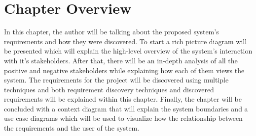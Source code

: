 \section{Chapter Overview}

In this chapter, the author will be talking about the proposed system's requirements and how they were discovered. To start a rich picture diagram will be presented which will explain the high-level overview of the system's interaction with it's stakeholders. After that, there will be an in-depth analysis of all the positive and negative stakeholders while explaining how each of them views the system. The requirements for the project will be discovered using multiple techniques and both requirement discovery techniques and discovered requirements will be explained within this chapter. Finally, the chapter will be concluded with a context diagram that will explain the system boundaries and a use case diagrams which will be used to visualize how the relationship between the requirements and the user of the system. 